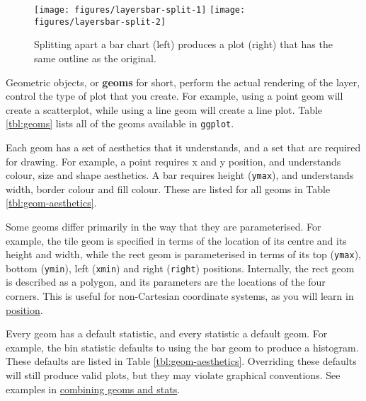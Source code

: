 \begin{figure}

{\centering \texttt{[image: figures/layersbar-split-1]} \texttt{[image: figures/layersbar-split-2]} 

}

\caption{Splitting apart a bar chart (left) produces a plot (right) that has the same outline as the original.\label{fig:bar-split}}
\end{figure}


Geometric objects, or \textbf{geoms} for short, perform the actual
rendering of the layer, control the type of plot that you create. For
example, using a point geom will create a scatterplot, while using a
line geom will create a line plot. Table \ref{tbl:geoms} lists all of
the geoms available in \texttt{ggplot}.

Each geom has a set of aesthetics that it understands, and a set that
are required for drawing. For example, a point requires x and y
position, and understands colour, size and shape aesthetics. A bar
requires height (\texttt{ymax}), and understands width, border colour
and fill colour. These are listed for all geoms in Table
\ref{tbl:geom-aesthetics}. 

Some geoms differ primarily in the way that they are parameterised. For
example, the tile geom is specified in terms of the location of its
centre and its height and width, while the rect geom is parameterised in
terms of its top (\texttt{ymax}), bottom (\texttt{ymin}), left
(\texttt{xmin}) and right (\texttt{right}) positions. 
Internally, the rect geom is described as a polygon, and its parameters
are the locations of the four corners. This is useful for non-Cartesian
coordinate systems, as you will learn in
\hyperref[cha:position]{position}. 

Every geom has a default statistic, and every statistic a default geom.
For example, the bin statistic defaults to using the bar geom to produce
a histogram. These defaults are listed in Table
\ref{tbl:geom-aesthetics}. Overriding these defaults will still produce
valid plots, but they may violate graphical conventions. See examples in
\hyperref[sub:new-plot-types]{combining geoms and stats}.

